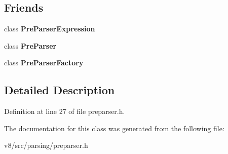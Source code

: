 \subsection*{Friends}
\begin{DoxyCompactItemize}
\item 
\mbox{\label{classv8_1_1internal_1_1PreParserIdentifier_abadb8c3c970501a35d2b45b9512eba94}} 
class {\bfseries Pre\+Parser\+Expression}
\item 
\mbox{\label{classv8_1_1internal_1_1PreParserIdentifier_aa52dc67118bf11b5e290e7675de340f2}} 
class {\bfseries Pre\+Parser}
\item 
\mbox{\label{classv8_1_1internal_1_1PreParserIdentifier_a352c2e06be1f10680f445e4e33e04c1c}} 
class {\bfseries Pre\+Parser\+Factory}
\end{DoxyCompactItemize}


\subsection{Detailed Description}


Definition at line 27 of file preparser.\+h.



The documentation for this class was generated from the following file\+:\begin{DoxyCompactItemize}
\item 
v8/src/parsing/preparser.\+h\end{DoxyCompactItemize}
